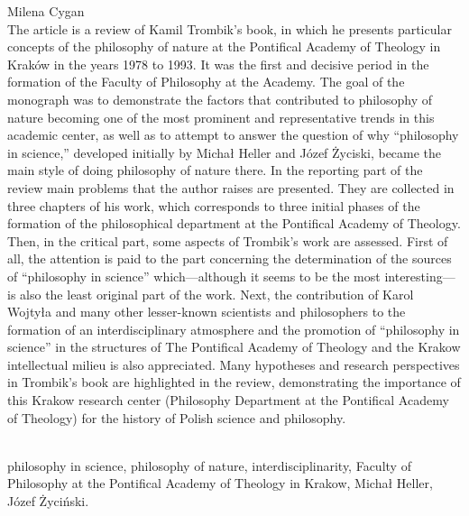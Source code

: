 \begin{newrevplenv}{Milena Cygan}
{}\\
{The article is a review of Kamil Trombik's book, in which he presents particular concepts of the philosophy of nature at the Pontifical Academy of Theology in Kraków in the years 1978 to 1993. It was the first and decisive period in the formation of the Faculty of Philosophy at the Academy.
The goal of the monograph was to demonstrate the factors that contributed to philosophy of nature becoming one of the most prominent and representative trends in this academic center, as well as to attempt to answer the question of why ``philosophy in science,'' developed initially by Michał Heller and Józef Życiski, became the main style of doing philosophy of nature there.
In the reporting part of the review main problems that the author raises are presented. They are collected in three chapters of his work, which corresponds to three initial phases of the formation of the philosophical department
at the Pontifical Academy of Theology.
Then, in the critical part, some aspects of Trombik's work are assessed. First of all, the attention is paid to the part concerning the determination of the sources of ``philosophy in science'' which---although it seems to be the most interesting---is also the least original part of the work.
Next, the contribution of Karol Wojtyła and many other lesser-known scientists and philosophers to the formation of an interdisciplinary atmosphere and the promotion of ``philosophy in science'' in the structures of The Pontifical Academy of Theology and the Krakow intellectual milieu is also appreciated.
Many hypotheses and research perspectives in Trombik's book are highlighted in the review, demonstrating the importance of this Krakow research center (Philosophy Department at the Pontifical Academy of Theology) for the history of Polish science and philosophy.
}\par%
\vspace{2mm}%
{}\\%
{philosophy in science, philosophy of nature, interdisciplinarity, Faculty of Philosophy at the Pontifical Academy of Theology in Krakow, Michał Heller, Józef Życiński.}%


\end{newrevplenv}

